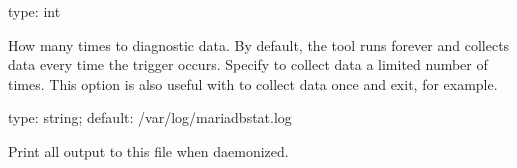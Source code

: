 \documentclass[letterpaper,10pt,english]{sphinxmanual}
\begin{document}

\begin{fulllineitems}
\label{\detokenize{mariadb-stat:cmdoption-mariadb-stat-iterations}}
\sphinxAtStartPar
type: int

\sphinxAtStartPar
How many times to {\hyperref[\detokenize{mariadb-stat:cmdoption-mariadb-stat-collect}]{}} diagnostic data.  By default, the tool
runs forever and collects data every time the trigger occurs.
Specify {\hyperref[\detokenize{mariadb-stat:cmdoption-mariadb-stat-iterations}]{}} to collect data a limited number of times.
This option is also useful with  to collect data once and
exit, for example.

\end{fulllineitems}


\begin{fulllineitems}
\label{\detokenize{mariadb-stat:cmdoption-mariadb-stat-log}}
\sphinxAtStartPar
type: string; default: /var/log/mariadb\sphinxhyphen{}stat.log

\sphinxAtStartPar
Print all output to this file when daemonized.

\end{fulllineitems}

\end{document}
